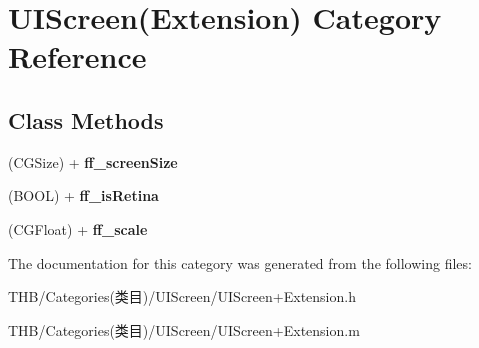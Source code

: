 \hypertarget{category_u_i_screen_07_extension_08}{}\section{U\+I\+Screen(Extension) Category Reference}
\label{category_u_i_screen_07_extension_08}
\subsection*{Class Methods}
\begin{DoxyCompactItemize}
\item 
\mbox{\label{category_u_i_screen_07_extension_08_afa82099da241c092bf0d554d4a3ab1b7}} 
(C\+G\+Size) + {\bfseries ff\+\_\+screen\+Size}
\item 
\mbox{\label{category_u_i_screen_07_extension_08_a6913dc789f96689a68f619bdebcd6e07}} 
(B\+O\+OL) + {\bfseries ff\+\_\+is\+Retina}
\item 
\mbox{\label{category_u_i_screen_07_extension_08_a81b36044953d450bf4f75e893478a256}} 
(C\+G\+Float) + {\bfseries ff\+\_\+scale}
\end{DoxyCompactItemize}


The documentation for this category was generated from the following files\+:\begin{DoxyCompactItemize}
\item 
T\+H\+B/\+Categories(类目)/\+U\+I\+Screen/U\+I\+Screen+\+Extension.\+h\item 
T\+H\+B/\+Categories(类目)/\+U\+I\+Screen/U\+I\+Screen+\+Extension.\+m\end{DoxyCompactItemize}
